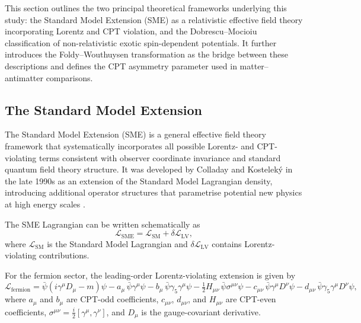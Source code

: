 \documentclass[12pt,a4paper]{report}
\begin{document}
This section outlines the two principal theoretical frameworks underlying this
study: the Standard Model Extension (SME) as a relativistic effective field
theory incorporating Lorentz and CPT violation, and the Dobrescu--Mocioiu
classification of non-relativistic exotic spin-dependent potentials. It further
introduces the Foldy--Wouthuysen transformation as the bridge between these
descriptions and defines the CPT asymmetry parameter used in matter--antimatter
comparisons.

\subsection{The Standard Model Extension}

The Standard Model Extension (SME) is a general effective field theory
framework that systematically incorporates all possible Lorentz- and
CPT-violating terms consistent with observer coordinate invariance and standard
quantum field theory structure. It was developed by Colladay and Kostelek\'{y}
in the late 1990s as an extension of the Standard Model Lagrangian density,
introducing additional operator structures that parametrise potential new
physics at high energy scales \cite{Colladay1997,Colladay1998}.

The SME Lagrangian can be written schematically as
\begin{equation}
  \mathcal{L}_{\mathrm{SME}}
  = \mathcal{L}_{\mathrm{SM}} + \delta\mathcal{L}_{\mathrm{LV}},
\end{equation}
where $\mathcal{L}_{\mathrm{SM}}$ is the Standard Model Lagrangian and
$\delta\mathcal{L}_{\mathrm{LV}}$ contains Lorentz-violating contributions.

For the fermion sector, the leading-order Lorentz-violating extension is given
by \cite{Colladay1998}
\begin{equation}
  \mathcal{L}_{\mathrm{fermion}}
  = \bar{\psi}\!\left(i\gamma^{\mu}D_{\mu} - m\right)\psi
  - a_{\mu}\,\bar{\psi}\gamma^{\mu}\psi
  - b_{\mu}\,\bar{\psi}\gamma_{5}\gamma^{\mu}\psi
  - \tfrac{1}{2}H_{\mu\nu}\,\bar{\psi}\sigma^{\mu\nu}\psi
  - c_{\mu\nu}\,\bar{\psi}\gamma^{\mu}D^{\nu}\psi
  - d_{\mu\nu}\,\bar{\psi}\gamma_{5}\gamma^{\mu}D^{\nu}\psi,
\end{equation}
where $a_{\mu}$ and $b_{\mu}$ are CPT-odd coefficients, $c_{\mu\nu}$,
$d_{\mu\nu}$, and $H_{\mu\nu}$ are CPT-even coefficients,
$\sigma^{\mu\nu} = \tfrac{i}{2}[\gamma^{\mu},\gamma^{\nu}]$, and $D_{\mu}$ is
the gauge-covariant derivative.
\end{document}

